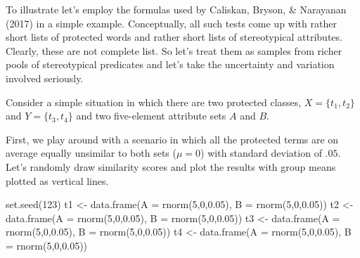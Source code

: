 \documentclass[
  10pt,
  dvipsnames,enabledeprecatedfontcommands]{scrartcl}
\newenvironment{Shaded}{\begin{snugshade}}{\end{snugshade}}
\newcommand{\AttributeTok}[1]{\textcolor[rgb]{0.77,0.63,0.00}{#1}}
\newcommand{\DecValTok}[1]{\textcolor[rgb]{0.00,0.00,0.81}{#1}}
\newcommand{\FloatTok}[1]{\textcolor[rgb]{0.00,0.00,0.81}{#1}}
\newcommand{\FunctionTok}[1]{\textcolor[rgb]{0.00,0.00,0.00}{#1}}
\newcommand{\NormalTok}[1]{#1}
\newcommand{\OtherTok}[1]{\textcolor[rgb]{0.56,0.35,0.01}{#1}}
\begin{document}
To illustrate let's employ the formulas used by Caliskan, Bryson, \&
Narayanan (2017) in a simple example. Conceptually, all such tests come
up with rather short lists of protected words and rather short lists of
stereotypical attributes. Clearly, these are not complete list. So let's
treat them as samples from richer pools of stereotypical predicates and
let's take the uncertainty and variation involved seriously.

Consider a simple situation in which there are two protected classes,
\(X=\{t_1,t_2\}\) and \(Y=\{t_3,t_4\}\) and two five-element attribute
sets \(A\) and \(B\).

First, we play around with a scenario in which all the protected terms
are on average equally unsimilar to both sets (\(\mu =0\)) with standard
deviation of \(.05\). Let's randomly draw similarity scores and plot the
results with group means plotted as vertical lines.

\footnotesize

\begin{Shaded}
\begin{Highlighting}[]
\FunctionTok{set.seed}\NormalTok{(}\DecValTok{123}\NormalTok{)}
\NormalTok{t1 }\OtherTok{\textless{}{-}} \FunctionTok{data.frame}\NormalTok{(}\AttributeTok{A  =} \FunctionTok{rnorm}\NormalTok{(}\DecValTok{5}\NormalTok{,}\DecValTok{0}\NormalTok{,}\FloatTok{0.05}\NormalTok{), }\AttributeTok{B =} \FunctionTok{rnorm}\NormalTok{(}\DecValTok{5}\NormalTok{,}\DecValTok{0}\NormalTok{,}\FloatTok{0.05}\NormalTok{))}
\NormalTok{t2 }\OtherTok{\textless{}{-}} \FunctionTok{data.frame}\NormalTok{(}\AttributeTok{A  =} \FunctionTok{rnorm}\NormalTok{(}\DecValTok{5}\NormalTok{,}\DecValTok{0}\NormalTok{,}\FloatTok{0.05}\NormalTok{), }\AttributeTok{B =} \FunctionTok{rnorm}\NormalTok{(}\DecValTok{5}\NormalTok{,}\DecValTok{0}\NormalTok{,}\FloatTok{0.05}\NormalTok{))}
\NormalTok{t3 }\OtherTok{\textless{}{-}} \FunctionTok{data.frame}\NormalTok{(}\AttributeTok{A  =} \FunctionTok{rnorm}\NormalTok{(}\DecValTok{5}\NormalTok{,}\DecValTok{0}\NormalTok{,}\FloatTok{0.05}\NormalTok{), }\AttributeTok{B =} \FunctionTok{rnorm}\NormalTok{(}\DecValTok{5}\NormalTok{,}\DecValTok{0}\NormalTok{,}\FloatTok{0.05}\NormalTok{))}
\NormalTok{t4 }\OtherTok{\textless{}{-}} \FunctionTok{data.frame}\NormalTok{(}\AttributeTok{A  =} \FunctionTok{rnorm}\NormalTok{(}\DecValTok{5}\NormalTok{,}\DecValTok{0}\NormalTok{,}\FloatTok{0.05}\NormalTok{), }\AttributeTok{B =} \FunctionTok{rnorm}\NormalTok{(}\DecValTok{5}\NormalTok{,}\DecValTok{0}\NormalTok{,}\FloatTok{0.05}\NormalTok{))}
\end{Highlighting}
\end{Shaded}
\end{document}
